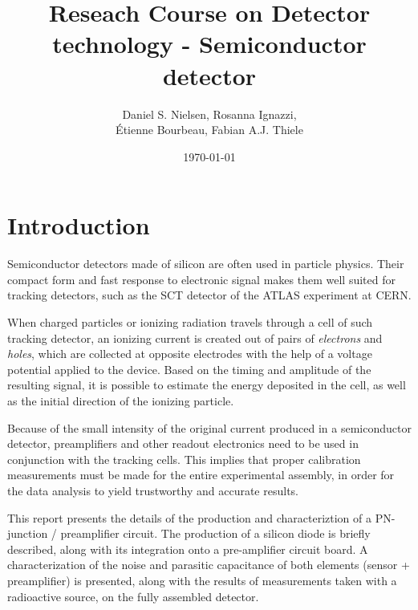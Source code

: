 \documentclass[12pt]{article}
\title{Reseach Course on Detector technology - Semiconductor detector}
\author{Daniel S. Nielsen, Rosanna Ignazzi, \\Étienne Bourbeau, Fabian A.J. Thiele}
\date{\today}
\begin{document}

\maketitle

\clearpage
  
\tableofcontents
  
  
  
  
\cleardoublepage

%
%

\section{Introduction}

Semiconductor detectors made of silicon are often used in particle physics. Their compact form and fast response to electronic signal makes them well suited for tracking detectors, such as the SCT detector of the ATLAS experiment at CERN.

When charged particles or ionizing radiation travels through a cell of such tracking detector, an ionizing current is created out of pairs of \textit{electrons} and \textit{holes}, which are collected at opposite electrodes with the help of a voltage potential applied to the device. Based on the timing and amplitude of the resulting signal, it is possible to estimate the energy deposited in the cell, as well as the initial direction of the ionizing particle.

Because of the small intensity of the original current produced in a semiconductor detector, preamplifiers and other readout electronics need to be used in conjunction with the tracking cells. This implies that proper calibration measurements must be made for the entire experimental assembly, in order for the data analysis to yield trustworthy and accurate results.

This report presents the details of the production and characteriztion of a PN-junction / preamplifier circuit. The production of a silicon diode is briefly described, along with its integration onto a pre-amplifier circuit board. A characterization of the noise and parasitic capacitance of both elements (sensor + preamplifier) is presented, along with the results of measurements taken with a radioactive source, on the fully assembled detector. 
\end{document}
